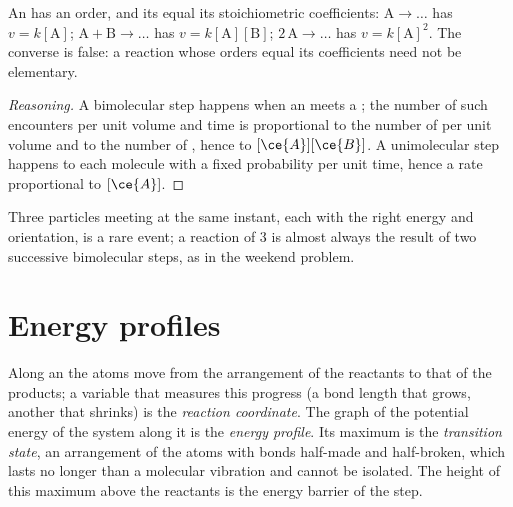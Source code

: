 \begin{proposition}\label{prop:b1:elementary-steps:elementary-law}
An  has an order, and its  equal its
stoichiometric coefficients: $\mathrm{A} \to \dots$ has $v = k[\mathrm{A}]$;
$\mathrm{A} + \mathrm{B} \to \dots$ has $v = k[\mathrm{A}][\mathrm{B}]$;
$2\,\mathrm{A} \to \dots$ has $v = k[\mathrm{A}]^2$. The converse is false:
a reaction whose orders equal its coefficients need not be elementary.
\end{proposition}

\begin{proof}[Reasoning]
A bimolecular step happens when an  meets a ; the number of
such encounters per unit volume and time is proportional to the number
of  per unit volume and to the number of , hence to
$[\ce{A}][\ce{B}]$. A unimolecular step happens to each molecule with a
fixed probability per unit time, hence a rate proportional to $[\ce{A}]$.
\end{proof}

\begin{remark}\label{rem:b1:elementary-steps:termolecular}
Three particles meeting at the same instant, each with the right energy
and orientation, is a rare event; a reaction of  3 is almost
always the result of two successive bimolecular steps, as in the
weekend problem.
\end{remark}

\section{Energy profiles}

\begin{definition}\label{def:b1:elementary-steps:energy-profile}
Along an  the atoms move from the arrangement of the
reactants to that of the products; a variable that measures this progress
(a bond length that grows, another that shrinks) is the \emph{reaction
coordinate}. The graph of the potential energy
of the system along it is the \emph{energy profile}.
Its maximum is the \emph{transition state},
an arrangement of the atoms with bonds half-made and
half-broken, which lasts no longer than a molecular vibration and cannot
be isolated. The height of this maximum above the reactants is the
energy barrier of the step.
\end{definition}

